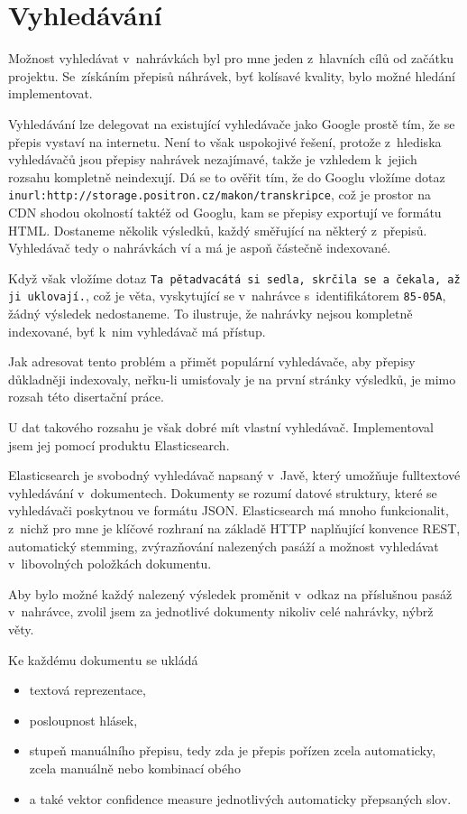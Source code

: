 \chapter{Vyhledávání}
\label{kap:vyhledavani}

Možnost vyhledávat v~nahrávkách byl pro mne jeden z~hlavních cílů od začátku
projektu. Se~získáním přepisů náhrávek, byť kolísavé kvality, bylo možné hledání
implementovat.

Vyhledávání lze delegovat na existující vyhledávače jako Google
prostě tím, že se přepis vystaví na internetu. Není to však uspokojivé řešení,
protože z~hlediska vyhledávačů jsou přepisy nahrávek nezajímavé, takže je
vzhledem k~jejich rozsahu kompletně neindexují. Dá se to ověřit tím, že do
Googlu vložíme dotaz
\texttt{inurl:http://storage.positron.cz/makon/transkripce}, což je prostor na
CDN shodou okolností taktéž od Googlu, kam se přepisy exportují ve formátu HTML.
Dostaneme několik výsledků, každý směřující na některý z~přepisů. Vyhledávač
tedy o nahrávkách ví a má je aspoň částečně indexované.

Když však vložíme dotaz \texttt{Ta pětadvacátá si sedla, skrčila se a čekala, až
ji uklovají.}, což je věta, vyskytující se v~nahrávce s~identifikátorem
\texttt{85-05A}, žádný výsledek nedostaneme. To ilustruje, že nahrávky nejsou
kompletně indexované, byť k~nim vyhledávač má přístup.

Jak adresovat tento problém a přimět populární vyhledávače, aby přepisy
důkladněji indexovaly, neřku-li umisťovaly je na první stránky výsledků, je mimo
rozsah této disertační práce.

U dat takového rozsahu je však dobré mít vlastní vyhledávač.
Implementoval jsem jej pomocí produktu Elasticsearch.

Elasticsearch je svobodný vyhledávač napsaný v~Javě, který umožňuje fulltextové
vyhledávání v~dokumentech. Dokumenty se rozumí datové struktury, které se
vyhledávači poskytnou ve formátu JSON. Elasticsearch má mnoho funkcionalit,
z~nichž pro mne je klíčové rozhraní na základě HTTP naplňující konvence REST,
automatický stemming, zvýrazňování nalezených pasáží a možnost vyhledávat
v~libovolných položkách dokumentu.

Aby bylo možné každý nalezený výsledek proměnit v~odkaz na příslušnou pasáž
v~nahrávce, zvolil jsem za jednotlivé dokumenty nikoliv celé nahrávky, nýbrž
věty.

Ke každému dokumentu se ukládá
\begin{itemize}
\item{textová reprezentace,}
\item{posloupnost hlásek,}
\item{stupeň
manuálního přepisu, tedy zda je přepis pořízen zcela automaticky, zcela manuálně
nebo kombinací obého}
\item{a také vektor confidence measure jednotlivých automaticky přepsaných slov.}
\end{itemize}

